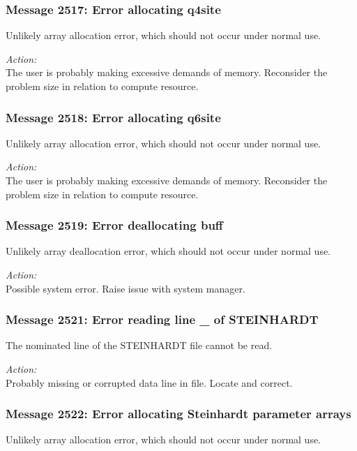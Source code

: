 \subsubsection*{Message 2517: Error allocating q4site}

Unlikely array allocation error, which should not occur under normal use.

\noindent
{\em Action:}\\ The user is probably making excessive demands of
memory. Reconsider the problem size in relation to compute resource.
          
\subsubsection*{Message 2518: Error allocating q6site}

Unlikely array allocation error, which should not occur under normal use.

\noindent
{\em Action:}\\ The user is probably making excessive demands of
memory. Reconsider the problem size in relation to compute resource.
          
\subsubsection*{Message 2519: Error deallocating buff}

Unlikely array deallocation error, which should not occur under normal use.

\noindent
{\em Action:}\\ Possible system error. Raise issue with system manager.
          
\subsubsection*{Message 2521: Error reading line \_ of STEINHARDT}

The nominated line of the STEINHARDT file cannot be read.

\noindent
{\em Action:}\\ Probably missing or corrupted data line in file. Locate and correct.
          
\subsubsection*{Message 2522: Error allocating Steinhardt parameter arrays}

Unlikely array allocation error, which should not occur under normal use.

